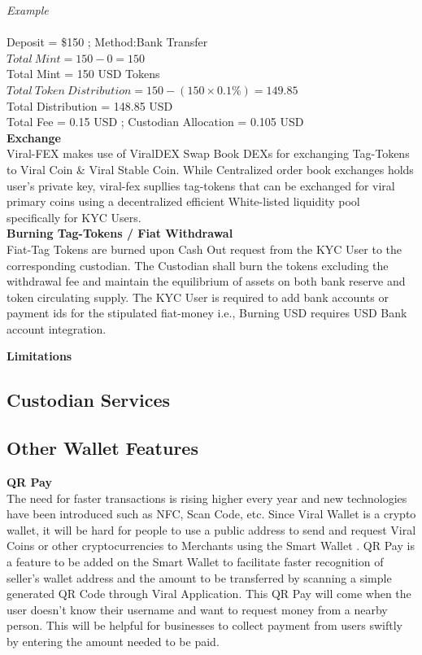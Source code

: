 \documentclass[10pt]{article}
\begin{document}
\textit{Example}\\\\
Deposit = \$150 ; Method:Bank Transfer\\
$Total\:Mint=150-0 = 150$\\
Total Mint = 150 USD Tokens\\
$Total\:Token\:Distribution=150-(150 \times 0.1\%)=149.85$\\
Total Distribution = 148.85 USD\\
Total Fee = 0.15 USD ; Custodian Allocation = 0.105 USD\\

\textbf{Exchange}\\

Viral-FEX makes use of ViralDEX Swap Book DEXs for exchanging Tag-Tokens to Viral Coin \& Viral Stable Coin. While Centralized order book exchanges holds user's private key, viral-fex supllies tag-tokens that can be exchanged for viral primary coins using a decentralized efficient White-listed liquidity pool specifically for KYC Users.\\




\textbf{Burning Tag-Tokens / Fiat Withdrawal}\\

Fiat-Tag Tokens are burned upon Cash Out request from the KYC User to the corresponding custodian. The Custodian shall burn the tokens excluding the withdrawal fee and maintain the equilibrium of assets on both bank reserve and token circulating supply. The KYC User is required to add bank accounts or payment ids for the stipulated fiat-money i.e., Burning USD requires USD Bank account integration. 



\textbf{Limitations}\\

\subsection{Custodian Services}

\subsection{Other Wallet Features}

\textbf{QR Pay}\\

The need for faster transactions is rising higher every year and new technologies have been introduced such as NFC, Scan Code, etc. Since Viral Wallet is a crypto wallet, it will be hard for people to use a public address to send and request Viral Coins or other cryptocurrencies to Merchants using the Smart Wallet . QR Pay is a feature to be added on the Smart Wallet to facilitate faster recognition of seller’s wallet address and the amount to be transferred by scanning a simple generated QR Code through Viral Application. This QR Pay will come when the user doesn’t know their username and want to request money from a nearby person. This will be helpful for businesses to collect payment from users swiftly by entering the amount needed to be paid.\\
\end{document}
